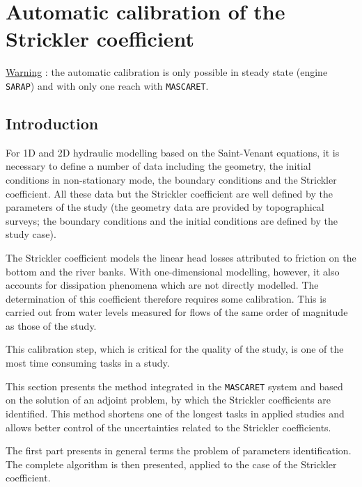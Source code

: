 \section{Automatic calibration of the Strickler coefficient}

\underline{Warning} : the automatic calibration is only possible in steady state (engine \texttt{SARAP}) and with only one reach with \texttt{MASCARET}.

\subsection{Introduction}

For 1D and 2D hydraulic modelling based on the Saint-Venant equations, it is necessary to define a number of data including the geometry, the initial conditions in non-stationary mode, the boundary conditions and the Strickler coefficient. All these data but the Strickler coefficient are well defined by the parameters of the study (the geometry data are provided by topographical surveys; the boundary conditions and the initial conditions are defined by the study case).

\vspace{0.5cm}

The Strickler coefficient models the linear head losses attributed to friction on the bottom and the river banks. With one-dimensional modelling, however, it also accounts for dissipation phenomena which are not directly modelled. The determination of this coefficient therefore requires some calibration. This is carried out from water levels measured for flows of the same order of magnitude as those of the study.

\vspace{0.5cm}

This calibration step, which is critical for the quality of the study, is one of the most time consuming tasks in a study.

\vspace{0.5cm}

This section presents the method integrated in the \texttt{MASCARET} system and based on the solution of an adjoint problem, by which the Strickler coefficients are identified. This method shortens one of the longest tasks in applied studies and allows better control of the uncertainties related to the Strickler coefficients.

\vspace{0.5cm}

The first part presents in general terms the problem of parameters identification. The complete algorithm is then presented, applied to the case of the Strickler coefficient.


